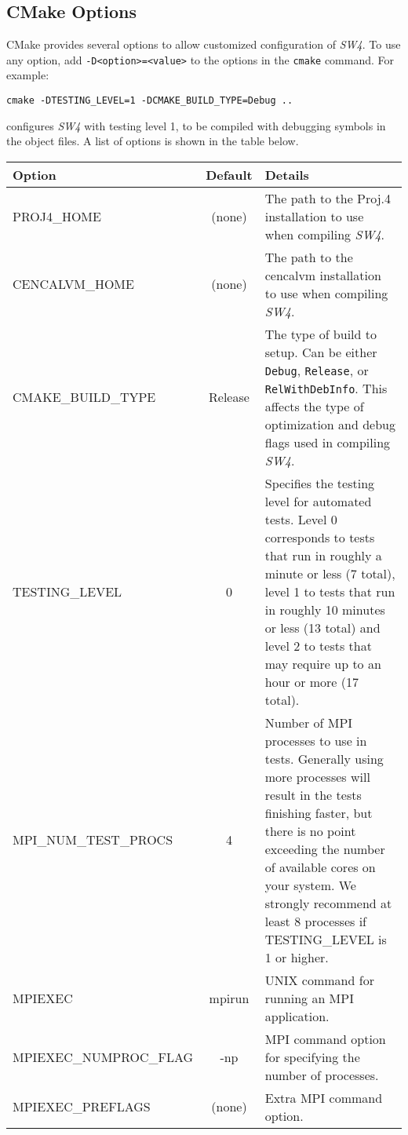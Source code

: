 \documentclass[11pt]{article}
\begin{document}
\subsection{CMake Options}
CMake provides several options to allow customized configuration of \emph{SW4}.  To use any option,
add \texttt{-D\textless option\textgreater=\textless value\textgreater} to the options in the
\texttt{cmake} command.  For example:
%
\begin{verbatim}
cmake -DTESTING_LEVEL=1 -DCMAKE_BUILD_TYPE=Debug ..
\end{verbatim}
%
configures \emph{SW4} with testing level 1, to be compiled with debugging symbols in the object
files. A list of options is shown in the table below.
%
\begin{center}
\begin{tabular}{|l|c|p{}|}
\hline
Option & Default & Details \\
\hline
%
PROJ4\_HOME & (none) & The path to the Proj.4 installation to use when compiling
\emph{SW4}. \\ \hline
%
CENCALVM\_HOME & (none) & The path to the cencalvm installation to use when compiling
\emph{SW4}. \\ \hline
%
CMAKE\_BUILD\_TYPE & Release & The type of build to setup. Can be either \texttt{Debug},
\texttt{Release}, or \texttt{RelWithDebInfo}.  This affects the type of optimization and debug flags
used in compiling \emph{SW4}. \\ \hline
%
TESTING\_LEVEL & 0 & Specifies the testing level for automated tests.  Level 0 corresponds to tests
that run in roughly a minute or less (7 total), level 1 to tests that run in roughly 10 minutes or
less (13 total) and level 2 to tests that may require up to an hour or more (17 total). \\ \hline
%
MPI\_NUM\_TEST\_PROCS & 4 & Number of MPI processes to use in tests. Generally using more processes
will result in the tests finishing faster, but there is no point exceeding the number of available
cores on your system.  We strongly recommend at least 8 processes if TESTING\_LEVEL is 1 or
higher.\\ \hline
%
%
MPIEXEC & mpirun & UNIX command for running an MPI application.\\ \hline
MPIEXEC\_NUMPROC\_FLAG & -np & MPI command option for specifying the number of processes.\\ \hline 
MPIEXEC\_PREFLAGS & (none) & Extra MPI command option.\\ \hline 
\end{tabular}
\end{center}
\end{document}
